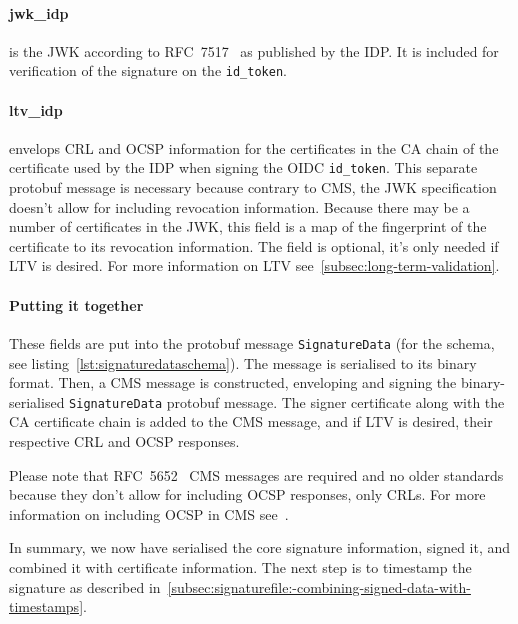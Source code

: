 \paragraph{jwk\_idp} is the \gls{JWK} according to RFC~7517~\cite{rfc7517} as published by the \gls{IDP}.
It is included for verification of the signature on the \texttt{id\_token}.
\paragraph{ltv\_idp} envelops \gls{CRL} and \gls{OCSP} information for the certificates in the \gls{CA} chain of the certificate used by the \gls{IDP} when signing the \gls{OIDC} \texttt{id\_token}.
This separate protobuf message is necessary because contrary to \gls{CMS}, the \gls{JWK} specification~\cite{rfc7517} doesn't allow for including revocation information.
Because there may be a number of certificates in the \gls{JWK}, this field is a map of the fingerprint of the certificate to its revocation information.
The field is optional, it's only needed if \gls{LTV} is desired.
For more information on \gls{LTV} see~\ref{subsec:long-term-validation}.

\paragraph{Putting it together}

These fields are put into the protobuf message \texttt{SignatureData} (for the schema, see listing~\ref{lst:signaturedataschema}).
The message is serialised to its binary format.
Then, a \gls{CMS} message is constructed, enveloping and signing the binary-serialised \texttt{SignatureData} protobuf message.
The signer certificate along with the \gls{CA} certificate chain is added to the \gls{CMS} message, and if \gls{LTV} is desired,
their respective \gls{CRL} and \gls{OCSP} responses.

Please note that RFC~5652~\cite{rfc5652} \gls{CMS} messages are required and no older standards
because they don't allow for including \gls{OCSP} responses, only \gls{CRL}s.
For more information on including \gls{OCSP} in \gls{CMS} see~\cite[Section 10.2.1, RevocationInfoChoices and OtherRevocationInfoFormat]{rfc5652}.

In summary, we now have serialised the core signature information, signed it, and combined it with certificate information.
The next step is to timestamp the signature as described in~\ref{subsec:signaturefile:-combining-signed-data-with-timestamps}.

